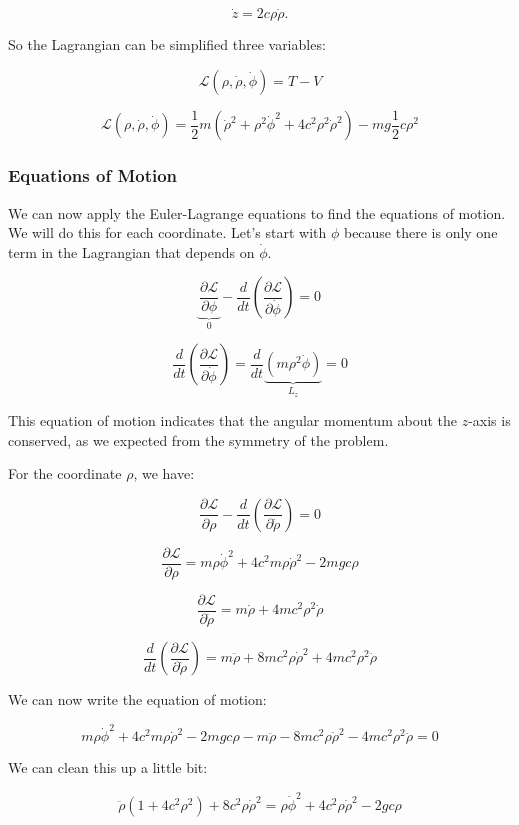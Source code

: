 \documentclass[11pt]{article}
\begin{document}
\[\dot{z} = 2c\rho\dot{\rho}.\]

So the Lagrangian can be simplified three variables:

\[\mathcal{L}(\rho, \dot{\rho}, \dot{\phi}) = T - V\]

\[\mathcal{L}(\rho, \dot{\rho}, \dot{\phi}) = \dfrac{1}{2}m\left(\dot{\rho}^2 + \rho^2\dot{\phi}^2 + 4c^2\rho^2\dot{\rho}^2\right) - mg\dfrac{1}{2}c\rho^2\]

\subsubsection{Equations of Motion}\label{equations-of-motion}

We can now apply the Euler-Lagrange equations to find the equations of
motion. We will do this for each coordinate. Let's start with \(\phi\)
because there is only one term in the Lagrangian that depends on
\(\dot{\phi}\).

\[\underbrace{\dfrac{\partial \mathcal{L}}{\partial \phi}}_0 - \dfrac{d}{dt}\left(\dfrac{\partial \mathcal{L}}{\partial \dot{\phi}}\right) = 0\]

\[\dfrac{d}{dt}\left(\dfrac{\partial \mathcal{L}}{\partial \dot{\phi}}\right) = \dfrac{d}{dt}\underbrace{\left(m\rho^2\dot{\phi}\right)}_{L_z} = 0\]

This equation of motion indicates that the angular momentum about the
\(z\)-axis is conserved, as we expected from the symmetry of the
problem.

For the coordinate \(\rho\), we have:

\[\dfrac{\partial \mathcal{L}}{\partial \rho} - \dfrac{d}{dt}\left(\dfrac{\partial \mathcal{L}}{\partial \dot{\rho}}\right) = 0\]

\[\dfrac{\partial \mathcal{L}}{\partial \rho} = m\rho\dot{\phi}^2 + 4c^2m\rho\dot{\rho}^2 - 2mgc\rho\]

\[\dfrac{\partial \mathcal{L}}{\partial \dot{\rho}} = m\dot{\rho} + 4mc^2\rho^2\dot{\rho}\]

\[\dfrac{d}{dt}\left(\dfrac{\partial \mathcal{L}}{\partial \dot{\rho}}\right) = m\ddot{\rho} + 8mc^2\rho\dot{\rho}^2 + 4mc^2\rho^2\ddot{\rho}\]

We can now write the equation of motion:

\[m\rho\dot{\phi}^2 + 4c^2m\rho\dot{\rho}^2 - 2mgc\rho - m\ddot{\rho} - 8mc^2\rho\dot{\rho}^2 - 4mc^2\rho^2\ddot{\rho} = 0\]

We can clean this up a little bit:

\[\ddot{\rho}(1+4c^2\rho^2) + 8c^2\rho\dot{\rho}^2 = \rho\dot{\phi}^2 + 4c^2\rho\dot{\rho}^2 - 2gc\rho\]
\end{document}
